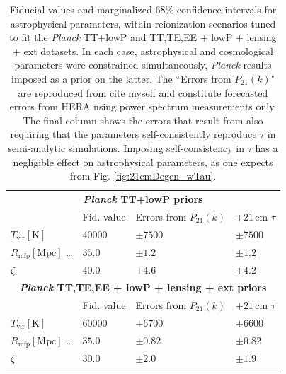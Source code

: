 \documentclass[twocolumn,aps,prd,nofootinbib,showpacs]{revtex4-1}
\begin{document}
\begin{table}
\caption{\label{tab:AstroParams} Fiducial values and marginalized $68\%$ confidence intervals for astrophysical parameters, within reionization scenarios tuned to fit the \emph{Planck} TT+lowP and TT,TE,EE + lowP + lensing + ext datasets. In each case, astrophysical and cosmological parameters were constrained simultaneously, \emph{Planck} results imposed as a prior on the latter. The ``Errors from $P_{21}(k)$" are reproduced from \acl{cite myself} and constitute forecasted errors from HERA using power spectrum measurements only. The final column shows the errors that result from also requiring that the parameters self-consistently reproduce $\tau$ in semi-analytic simulations. Imposing self-consistency in $\tau$ has a negligible effect on astrophysical parameters, as one expects from Fig. \ref{fig:21cmDegen_wTau}.}
\begin{ruledtabular}
\begin{tabular}{llll}
\multicolumn{4}{c}{   \textbf{\emph{Planck} TT+lowP priors} }  \\
& Fid. value & Errors from  $P_{21} (k)$ & $+21\,\textrm{cm}$ $\tau$\\
\hline
$T_\textrm{vir}\left[ \textrm{K} \right]$  \dotfill & $40000$ & $\pm 7500$ & $\pm 7500$ \\
 $R_\textrm{mfp}\left[ \textrm{Mpc} \right]$ \dots \dotfill & $35.0$ & $\pm1.2$ & $\pm1.2$ \\
$\zeta$ \dotfill& $40.0$ & $\pm 4.6$ & $\pm 4.2$ \\
\hline 
\multicolumn{4}{c}{    \textbf{\emph{Planck} TT,TE,EE + lowP + lensing + ext priors} }  \\
& Fid. value & Errors from  $P_{21} (k)$  & $+21\,\textrm{cm}$ $\tau$\\
\hline
$T_\textrm{vir}\left[ \textrm{K} \right]$  \dotfill & $60000$ & $\pm 6700$ & $\pm 6600$ \\
$R_\textrm{mfp}\left[ \textrm{Mpc} \right]$ \dots \dotfill & $35.0$ & $\pm 0.82$ & $\pm 0.82$ \\
$\zeta$ \dotfill& $30.0$ & $\pm 2.0$ & $\pm 1.9$\\
\end{tabular}
\end{ruledtabular}
\end{table}
\end{document}
